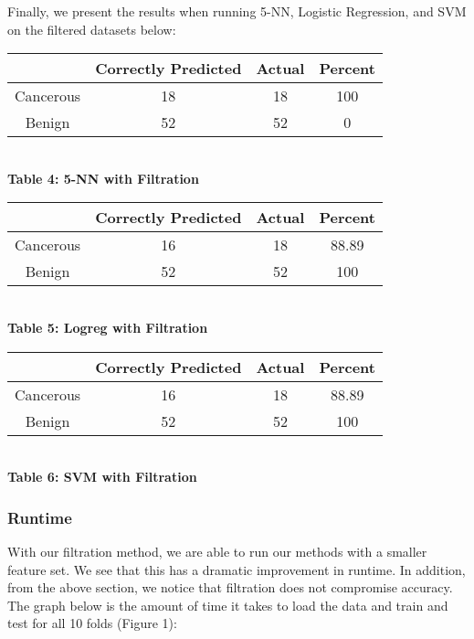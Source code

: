 \documentclass[12pt]{scrartcl}
\begin{document}
    Finally, we present the results when running 5-NN, Logistic Regression, and SVM on the filtered datasets below:
    
    \begin{center}
    \begin{tabular}{c|c|c|c}
    \hline
    & Correctly Predicted & Actual & Percent\\
    \hline
    Cancerous & 18 & 18 & 100\\
    Benign & 52 & 52 & 0\\
    \hline
    \end{tabular}\\
    \vspace{0.1in}
    \textbf{Table 4: 5-NN with Filtration}
    \end{center}
    
    \begin{center}
    \begin{tabular}{c|c|c|c}
    \hline
    & Correctly Predicted & Actual & Percent\\
    \hline
    Cancerous & 16 & 18 & 88.89\\
    Benign & 52 & 52 & 100\\
    \hline
    \end{tabular}\\
    \vspace{0.1in}
    \textbf{Table 5: Logreg with Filtration}
    \end{center}
    
    \begin{center}
    \begin{tabular}{c|c|c|c}
    \hline
    & Correctly Predicted & Actual & Percent\\
    \hline
    Cancerous & 16 & 18 & 88.89\\
    Benign & 52 & 52 & 100\\
    \hline
    \end{tabular}\\
    \vspace{0.1in}
    \textbf{Table 6: SVM with Filtration}
    \end{center}
    
    
    
    
    \subsubsection{Runtime}
    With our filtration method, we are able to run our methods with a smaller feature set. We see that this has a dramatic improvement in runtime. In addition, from the above section, we notice that filtration does not compromise accuracy. The graph below is the amount of time it takes to load the data and train and test for all 10 folds (Figure 1):
    
\end{document}
